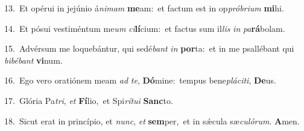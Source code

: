{\numbfont\textcolor{\numbcolor}{13.}}~Et opérui in jejúnio á\-\textit{ni}\-\textit{mam} \textbf{me}\-am:~\star et factum est in op\-\textit{pró}\-\textit{bri}\textit{um} \textbf{mi}\-hi.\par
{\numbfont\textcolor{\numbcolor}{14.}}~Et pósui vestiméntum me\textit{um} \textit{ci}\-\textbf{lí}cium:~\star et factus sum il\textit{lis} \textit{in} \textit{pa}\-\textbf{rá}bolam.\par
{\numbfont\textcolor{\numbcolor}{15.}}~Advérsum me loquebántur, qui sedé\textit{bant} \textit{in} \textbf{por}\-ta:~\star et in me psallébant qui \textit{bi}\-\textit{bé}\textit{bant} \textbf{vi}\-num.\par
{\numbfont\textcolor{\numbcolor}{16.}}~Ego vero oratiónem meam \textit{ad} \textit{te}\-, \textbf{Dó}\-mine:~\star tempus bene\-\textit{plá}\-\textit{ci}\textit{ti}, \textbf{De}\-us.\par
{\numbfont\textcolor{\numbcolor}{17.}}~Glória Pa\-\textit{tri}\-, \textit{et} \textbf{Fí}\-lio,~\star et Spi\-\textit{rí}\-\textit{tu}\textit{i} \textbf{Sanc}\-to.\par
{\numbfont\textcolor{\numbcolor}{18.}}~Sicut erat in princípio, et \textit{nunc}\-, \textit{et} \textbf{sem}\-per,~\star et in sǽcula sæ\-\textit{cu}\-\textit{ló}\textit{rum}. \textbf{A}\-men.\par

